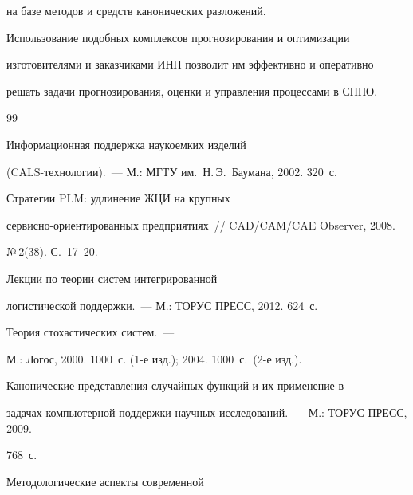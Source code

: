 на базе методов и средств канонических разложений.



    Использование подобных комплексов прогнозирования и оптимизации

изготовителями и заказчиками ИНП позволит им эффективно и оперативно

решать задачи прогнозирования, оценки и управления процессами в СППО.



{\small\frenchspacing

{%


\begin{thebibliography}{99}






 Информационная поддержка наукоемких изделий

(CALS-тех\-но\-ло\-гии).~--- М.: МГТУ им.\ Н.\,Э.~Баумана, 2002. 320~с.


 Стратегии PLM: удлинение ЖЦИ на крупных

сер\-вис\-но-ори\-ен\-ти\-ро\-ван\-ных предприятиях~/\!\!/ CAD/CAM/CAE Observer, 2008.

№\,2(38). С.~17--20.


 Лекции по теории систем интегрированной

логистической поддержки.~--- М.: ТОРУС ПРЕСС, 2012. 624~с.




 Теория стохастических сис\-тем.~---

М.: Логос, 2000. 1000~с. (1-е изд.); 2004. 1000~с.\ (2-е изд.).


 Канонические представления случайных функций и их применение в

задачах компьютерной поддержки научных исследований.~--- М.: ТОРУС ПРЕСС, 2009.

768~с.


 Методологические аспекты современной


\end{thebibliography}}}
